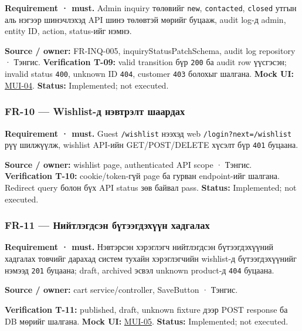 \documentclass[
  mongolian,
]{article}
\begin{document}
\textbf{Requirement · must.} Admin inquiry төлөвийг \texttt{new},
\texttt{contacted}, \texttt{closed} утгын аль нэгээр шинэчлэхэд API шинэ
төлөвтэй мөрийг буцааж, audit log-д admin, entity ID, action, status-ийг
нэмнэ.

\textbf{Source / owner:} FR-INQ-005, inquiryStatusPatchSchema, audit log
repository · Тэнгис. \textbf{Verification T-09:} valid transition бүр
\texttt{200} ба audit row үүсгэсэн; invalid status \texttt{400}, unknown
ID \texttt{404}, customer \texttt{403} болохыг шалгана. \textbf{Mock
UI:} \href{../assets/04-admin-inbox.png}{MUI-04}. \textbf{Status:}
Implemented; not executed.

\subsubsection{FR-10 --- Wishlist-д нэвтрэлт
шаардах}\label{fr-10-wishlist-ux434-ux43dux44dux432ux442ux440ux44dux43bux442-ux448ux430ux430ux440ux434ux430ux445}

\textbf{Requirement · must.} Guest \texttt{/wishlist} нээхэд web
\texttt{/login?next=/wishlist} рүү шилжүүлж, wishlist API-ийн
GET/POST/DELETE хүсэлт бүр \texttt{401} буцаана.

\textbf{Source / owner:} wishlist page, authenticated API scope ·
Тэнгис. \textbf{Verification T-10:} cookie/token-гүй page ба гурван
endpoint-ийг шалгана. Redirect query болон бүх API status зөв байвал
pass. \textbf{Status:} Implemented; not executed.

\subsubsection{FR-11 --- Нийтлэгдсэн бүтээгдэхүүн
хадгалах}\label{fr-11-ux43dux438ux439ux442ux43bux44dux433ux434ux441ux44dux43d-ux431ux4afux442ux44dux44dux433ux434ux44dux445ux4afux4afux43d-ux445ux430ux434ux433ux430ux43bux430ux445}

\textbf{Requirement · must.} Нэвтэрсэн хэрэглэгч нийтлэгдсэн
бүтээгдэхүүний хадгалах товчийг дарахад систем тухайн хэрэглэгчийн
wishlist-д бүтээгдэхүүнийг нэмээд \texttt{201} буцаана; draft, archived
эсвэл unknown product-д \texttt{404} буцаана.

\textbf{Source / owner:} cart service/controller, SaveButton · Тэнгис.

\textbf{Verification T-11:} published, draft, unknown fixture дээр POST
response ба DB мөрийг шалгана. \textbf{Mock UI:}
\href{../assets/05-wishlist.png}{MUI-05}. \textbf{Status:} Implemented;
not executed.
\end{document}
